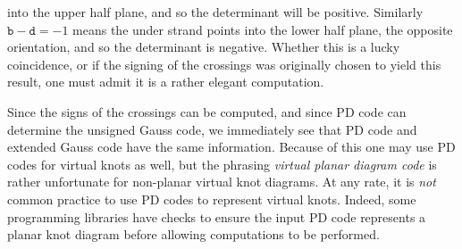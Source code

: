         into the upper half plane, and so the determinant will be
        positive. Similarly $\texttt{b}-\texttt{d}=-1$ means the under strand
        points into the lower half plane, the opposite orientation, and so
        the determinant is negative. Whether this is a
        lucky coincidence, or if the signing of the crossings was originally
        chosen to yield this result, one must admit it is a rather elegant
        computation.
        \par\hfill\par
        Since the signs of the crossings can be computed, and since
        PD code can determine the unsigned Gauss code, we immediately see that
        PD code and extended Gauss code have the same information. Because of
        this one may use PD codes for virtual knots as well, but the phrasing
        \textit{virtual planar diagram code} is rather unfortunate for
        non-planar virtual knot diagrams. At any rate, it is \textit{not}
        common practice to use PD codes to represent virtual knots. Indeed,
        some programming libraries have checks to ensure the input PD code
        represents a planar knot diagram before allowing computations to be
        performed.
